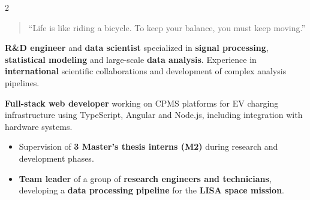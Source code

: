 \documentclass[8pt,a4paper,ragged2e,withhyper]{../_shared/altacv}
\begin{document}
\begin{paracol}{2}
\switchcolumn



\begin{quote}
``Life is like riding a bicycle. To keep your balance, you must keep moving.''
\end{quote}

{}

\textbf{R\&D engineer} and \textbf{data scientist} specialized in \textbf{signal processing}, \textbf{statistical modeling} and large-scale \textbf{data analysis}. Experience in \textbf{international} scientific collaborations and development of complex analysis pipelines. 

\textbf{Full-stack web developer} working on CPMS platforms for EV charging infrastructure using TypeScript, Angular and Node.js, including integration with hardware systems.


\begin{itemize}
  \item Supervision of \textbf{3 Master’s thesis interns (M2)} during research and development phases.
  \item \textbf{Team leader} of a group of \textbf{research engineers and technicians}, developing a \textbf{data processing pipeline} for the \textbf{LISA space mission}.
\end{itemize}


{}
\divider

\divider


\medskip

\divider



\end{paracol}
\end{document}
